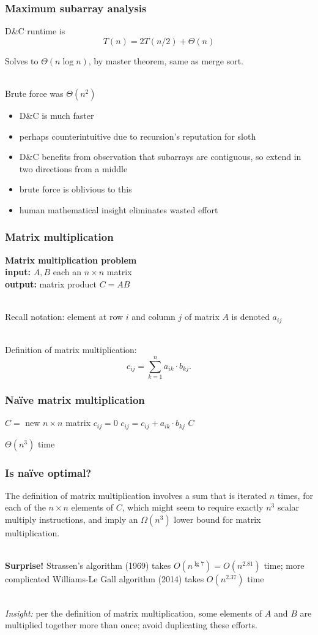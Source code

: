 \documentclass{beamer}
\newcommand{\stanza}{ \\~\ }
\begin{document}
\begin{frame} \frametitle{Maximum subarray analysis}
  D\&C runtime is \[ T(n) = 2 T(n/2) + \Theta(n) \]

  Solves to $\Theta(n \log n)$, by master theorem, same as merge sort. \stanza

  Brute force was $\Theta(n^2)$
  \begin{itemize}
    \item D\&C is much faster
    \item perhaps counterintuitive due to recursion's reputation for sloth
    \item D\&C benefits from observation that subarrays are contiguous, so
      extend in two directions from a middle
    \item brute force is oblivious to this
    \item human mathematical insight eliminates wasted effort
  \end{itemize}
\end{frame}

\begin{frame} \frametitle{Matrix multiplication}
  \textbf{Matrix multiplication problem} \\
  \textbf{input: } $A, B$ each an $n \times n$ matrix \\
  \textbf{output: } matrix product $C = AB$ \stanza

  Recall notation: element at row $i$ and column $j$ of matrix $A$ is
  denoted $a_{ij}$ \stanza

  Definition of matrix multiplication:
  \[ c_{ij} = \sum_{k=1}^n a_{ik} \cdot b_{kj} . \]
\end{frame}

\begin{frame} \frametitle{Na\"ive matrix multiplication}
  {
  \begin{algorithmic}[1]
    \State $C = $ new $n \times n$ matrix
        \State $c_{ij} = 0$
          \State $c_{ij} = c_{ij} + a_{ik} \cdot b_{kj}$
        \EndFor
      \EndFor
    \EndFor
    \State \Return $C$
    \EndFunction
  \end{algorithmic}
  }
  $\Theta(n^3)$ time
\end{frame}

\begin{frame} \frametitle{Is na\"ive optimal?}
The definition of matrix multiplication involves a sum that is iterated $n$
times, for each of the $n \times n$ elements of $C$, which might seem to
require exactly $n^3$ scalar multiply instructions, and imply an
$\Omega(n^3)$ lower bound for matrix multiplication. \stanza

\textbf{Surprise!} Strassen's algorithm (1969) takes $O(n^{\lg 7})=O(n^{2.81})$ time;
 more complicated Williams-Le Gall algorithm (2014) takes $O(n^{2.37})$ time \stanza

\emph{Insight:} per the definition of matrix multiplication, some elements of
$A$ and $B$ are multiplied together more than once; avoid duplicating these
efforts.
\end{frame}
\end{document}
